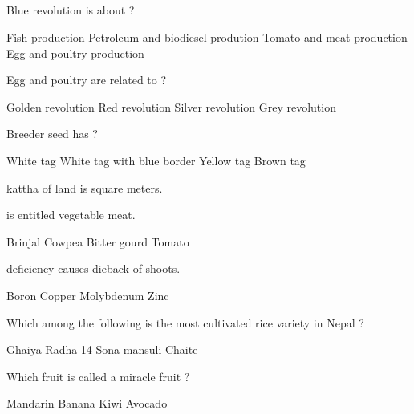 
\subsection*{}

\begin{questions}

\question Blue revolution is about ?
\begin{choices}
\CorrectChoice Fish production
\choice Petroleum and biodiesel prodution
\choice Tomato and meat production
\choice Egg and poultry production
\end{choices}

\question Egg and poultry are related to ?
\begin{choices}
\choice Golden revolution
\choice Red revolution
\CorrectChoice Silver revolution
\choice Grey revolution
\end{choices}

\question Breeder seed has \fillin[][3cm]?
\begin{choices}
\choice White tag
\choice White tag with blue border
\choice Yellow tag
\CorrectChoice Brown tag
\end{choices}

 kattha of land is \fillin[][3cm] square meters.
\begin{choices}
\end{choices}

\question \fillin[][2.5cm] is entitled vegetable meat.
\begin{choices}
\choice Brinjal
\choice Cowpea
\choice Bitter gourd
\choice Tomato
\end{choices}

\question \fillin[][3cm] deficiency causes dieback of shoots.
\begin{choices}
\choice Boron
\CorrectChoice Copper
\choice Molybdenum
\choice Zinc
\end{choices}

\question Which among the following is the most cultivated rice variety in Nepal ?
\begin{choices}
\choice Ghaiya
\choice Radha-14
\CorrectChoice Sona mansuli
\choice Chaite
\end{choices}

\question Which fruit is called a miracle fruit ?
\begin{choices}
\choice Mandarin
\choice Banana
\choice Kiwi
\choice Avocado
\end{choices}


\end{questions}
